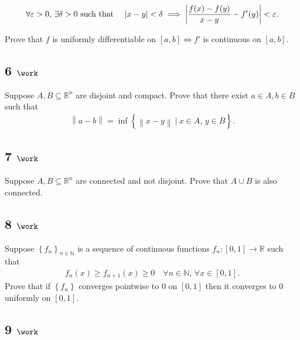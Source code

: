 \begin{align*}  
\forall \varepsilon > 0,\, \exists \delta > 0 \text{ such that } \quad {\left\lvert {x-y} \right\rvert} < \delta \implies {\left\lvert { {f(x) - f(y) \over x-y}  - f'(y)} \right\rvert}  < {\varepsilon}
.\end{align*}

Prove that \(f\) is uniformly differentiable on \([a, b] \iff f'\) is
continuous on \([a, b]\).

\hypertarget{work-5}{%
\subsection{\texorpdfstring{6
\(\work\)}{6 \textbackslash work}}\label{work-5}}

Suppose \(A, B \subseteq {\mathbb{R}}^n\) are disjoint and compact.
Prove that there exist \(a\in A, b\in B\) such that
\begin{align*}  
{\left\lVert {a - b} \right\rVert} = \inf\left\{{{\left\lVert {x-y} \right\rVert} {~\mathrel{\Big|}~}x\in A,\, y\in B}\right\}
.\end{align*}

\hypertarget{work-6}{%
\subsection{\texorpdfstring{7
\(\work\)}{7 \textbackslash work}}\label{work-6}}

Suppose \(A, B\subseteq {\mathbb{R}}^n\) are connected and not disjoint.
Prove that \(A\cup B\) is also connected.

\hypertarget{work-7}{%
\subsection{\texorpdfstring{8
\(\work\)}{8 \textbackslash work}}\label{work-7}}

Suppose \(\left\{{f_n}\right\}_{n\in {\mathbb{N}}}\) is a sequence of
continuous functions \(f_n: [0, 1]\to {\mathbb{R}}\) such that
\begin{align*}  
f_n(x) \geq f_{n+1}(x) \geq 0 \quad \forall n\in {\mathbb{N}},\, \forall x\in [0, 1]
.\end{align*}
Prove that if \(\left\{{f_n}\right\}\) converges pointwise to \(0\) on
\([0, 1]\) then it converges to \(0\) uniformly on \([0, 1]\).

\hypertarget{work-8}{%
\subsection{\texorpdfstring{9
\(\work\)}{9 \textbackslash work}}\label{work-8}}

